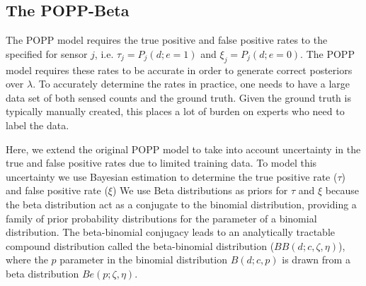 
\subsection{The POPP-Beta}
\label{subsec:popb}

The POPP model requires the true positive and false positive rates to the specified for sensor $j$, i.e.  $\tau_j = P_j(d;e=1)$ and $\xi_j = P_j(d;e=0)$. 
The POPP model requires these rates to be accurate in order to generate correct posteriors over $\lambda$. To accurately determine the rates in practice, one needs to have a large data set of both sensed counts and the ground truth. Given the ground truth is typically manually created, this places a lot of burden on experts who need to label the data.   

Here, we extend the original POPP model to take into account uncertainty in the true and false positive rates due to limited training data.
% 
To model this uncertainty we use Bayesian estimation to determine the 
true positive rate ($\tau$) and false positive rate ($\xi$)
% 
We use Beta distributions as priors for $\tau$ and $\xi$ because the beta distribution act as a conjugate to the binomial distribution, providing a family of prior probability distributions for the parameter of a binomial distribution. The beta-binomial conjugacy leads to an analytically tractable compound distribution called the beta-binomial distribution ($BB(d ; c, \zeta, \eta)$), where the $p$ parameter in the binomial distribution $B(d ; c, p)$ is drawn from a beta distribution $Be(p ; \zeta, \eta)$.


